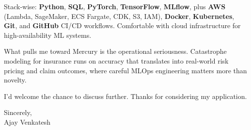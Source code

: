 \documentclass[letterpaper,11pt]{article}
\begin{document}
Stack-wise: \textbf{Python}, \textbf{SQL}, \textbf{PyTorch}, \textbf{TensorFlow}, \textbf{MLflow}, plus \textbf{AWS} (Lambda, SageMaker, ECS Fargate, CDK, S3, IAM), \textbf{Docker}, \textbf{Kubernetes}, \textbf{Git}, and \textbf{GitHub} CI/CD workflows. Comfortable with cloud infrastructure for high-availability ML systems.

What pulls me toward Mercury is the operational seriousness. Catastrophe modeling for insurance runs on accuracy that translates into real-world risk pricing and claim outcomes, where careful MLOps engineering matters more than novelty.

I'd welcome the chance to discuss further. Thanks for considering my application.

\vspace{12pt}
Sincerely, \\
Ajay Venkatesh
\end{document}
